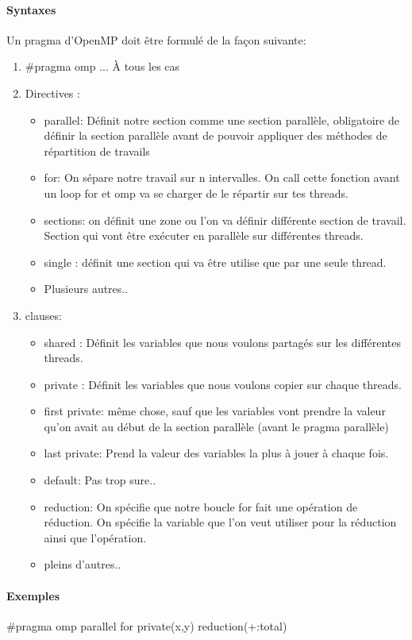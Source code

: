 \documentclass[oneside]{book}
\begin{document}
\paragraph{Syntaxes}
Un pragma d'OpenMP doit être formulé de la façon suivante:
\begin{enumerate}
\item \#pragma omp ... À tous les cas
\item Directives : 
\begin{itemize}
\item parallel: Définit notre section comme une section parallèle, obligatoire de définir la section parallèle avant de pouvoir appliquer des méthodes de répartition de travails
\item for: On sépare notre travail sur n intervalles. On call cette fonction avant un loop for et omp va se charger de le répartir sur tes threads.
\item sections: on définit une zone ou l'on va définir différente section de travail. Section qui vont être exécuter en parallèle sur différentes threads.
\item single : définit une section qui va être utilise que par une seule thread.
\item Plusieurs autres..
\end{itemize}

\item clauses:
\begin{itemize}
\item shared : Définit les variables que nous voulons partagés sur les différentes threads.
\item private :  Définit les variables que nous voulons copier sur chaque threads.
\item first private: même chose, sauf que les variables vont prendre la valeur qu'on avait au début de la section parallèle (avant le pragma parallèle)
\item last private: Prend la valeur des variables la plus à jouer à chaque fois.
\item default: Pas trop sure..
\item reduction: On spécifie que notre boucle for fait une opération de réduction. On spécifie la variable que l'on veut utiliser pour la réduction ainsi que l'opération.
\item pleins d'autres..
\end{itemize}
\end{enumerate}
\paragraph{Exemples} \#pragma omp parallel for private(x,y) reduction(+:total)
\end{document}
